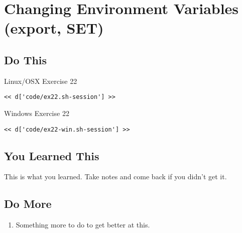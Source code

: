 \chapter{Changing Environment Variables (export, SET)}

\section{Do This}

\begin{code}{Linux/OSX Exercise 22}
\begin{Verbatim}
<< d['code/ex22.sh-session'] >>
\end{Verbatim}
\end{code}

\begin{code}{Windows Exercise 22}
\begin{Verbatim}
<< d['code/ex22-win.sh-session'] >>
\end{Verbatim}
\end{code}

\section{You Learned This}

This is what you learned.  Take notes and come back if you didn't get it.

\section{Do More}

\begin{enumerate}
\item Something more to do to get better at this.
\end{enumerate}

